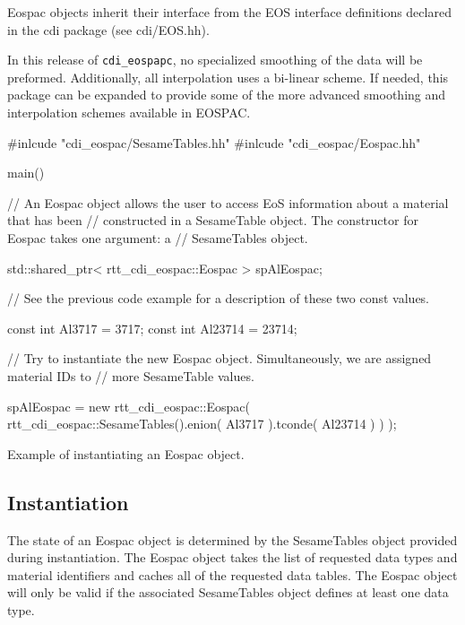 \documentclass[11pt]{nmemo}
\newenvironment{codeExample}
{\footnotesize
  \VerbatimEnvironment
  \begin{SaveVerbatim}{\mycode}}%
  {\end{SaveVerbatim}%
  \noindent%
  \parashade[.950]{sharpcorners}{\gdef\outlineboxwidth{.5}%
    \UseVerbatim{\mycode}}\normalsize}
\begin{document}
Eospac objects inherit their interface from the EOS interface
definitions declared in the cdi package (see cdi/EOS.hh).

In this release of \texttt{cdi\_eospapc}, no specialized smoothing of
the data will be preformed.  Additionally, all interpolation uses a
bi-linear scheme.  If needed, this package can be expanded to provide
some of the more advanced smoothing and interpolation schemes
available in EOSPAC.



\begin{cxxSampleCode}
\begin{codeExample}
#inlcude "cdi_eospac/SesameTables.hh"
#inlcude "cdi_eospac/Eospac.hh"

main()
{
  // An Eospac object allows the user to access EoS information about a material that has been
  // constructed in a SesameTable object.  The constructor for Eospac takes one argument: a
  // SesameTables object.

  std::shared_ptr< rtt_cdi_eospac::Eospac > spAlEospac;

  // See the previous code example for a description of these two const values.

  const int Al3717  = 3717; const int Al23714 = 23714;

  // Try to instantiate the new Eospac object.  Simultaneously, we are assigned material IDs to
  // more SesameTable values.

  spAlEospac = new
    rtt_cdi_eospac::Eospac( rtt_cdi_eospac::SesameTables().enion( Al3717 ).tconde( Al23714 ) ) );
 }
\end{codeExample}
\caption{Example of instantiating an Eospac object.}
\label{codeExample:EospacInstantiation}
\end{cxxSampleCode}

\subsection{Instantiation}

The state of an Eospac object is determined by the SesameTables object
provided during instantiation.  The Eospac object takes the list of
requested data types and material identifiers and caches all of the
requested data tables.  The Eospac object will only be valid if the
associated SesameTables object defines at least one data type.
\end{document}
